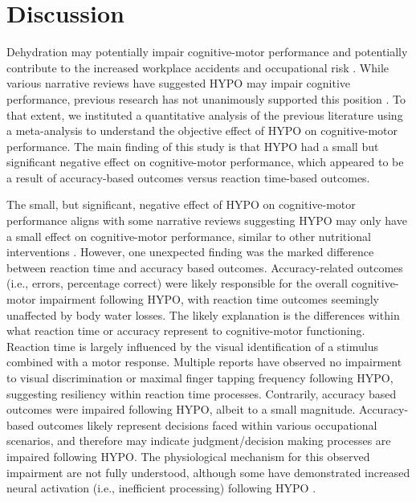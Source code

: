 

\section{Discussion}
Dehydration may potentially impair cognitive-motor performance and potentially contribute to the increased workplace accidents and occupational risk \cite{kenefick_hydration_2007}. While various narrative reviews have suggested HYPO may impair cognitive performance, previous research has not unanimously supported this position \cite{cheuvront_dehydration:_2014}. To that extent, we instituted a quantitative analysis of the previous literature using a meta-analysis to understand the objective effect of HYPO on cognitive-motor performance. The main finding of this study is that HYPO had a small but significant negative effect on cognitive-motor performance, which appeared to be a result of accuracy-based outcomes versus reaction time-based outcomes.

The small, but significant, negative effect of HYPO on cognitive-motor performance aligns with some narrative reviews suggesting HYPO may only have a small effect on cognitive-motor performance, similar to other nutritional interventions \cite{masento_effects_2014}. However, one unexpected finding was the marked difference between reaction time and accuracy based outcomes. Accuracy-related outcomes (i.e., errors, percentage correct) were likely responsible for the overall cognitive-motor impairment following HYPO, with reaction time outcomes seemingly unaffected by body water losses. The likely explanation is the differences within what reaction time or accuracy represent to cognitive-motor functioning. Reaction time is largely influenced by the visual identification of a stimulus combined with a motor response. Multiple reports have observed no impairment to visual discrimination \cite{grego_influence_2005, van_den_heuvel_independent_2017} or maximal finger tapping frequency \cite{bandelow_effects_2010} following HYPO, suggesting resiliency within reaction time processes. Contrarily, accuracy based outcomes were impaired following HYPO, albeit to a small magnitude. Accuracy-based outcomes likely represent decisions faced within various occupational scenarios, and therefore may indicate judgment/decision making processes are impaired following HYPO. The physiological mechanism for this observed impairment are not fully understood, although some have demonstrated increased neural activation (i.e., inefficient processing) following HYPO \cite{kempton_dehydration_2011,watson_mild_2015}. 

